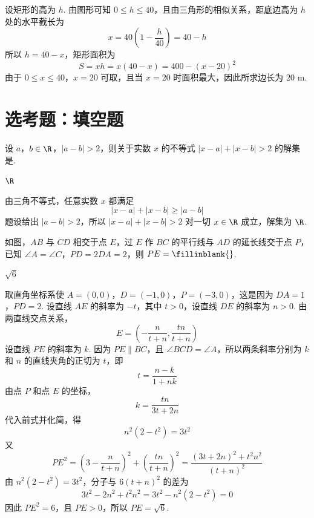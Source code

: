 \begin{solution}
设矩形的高为 \(h\). 由图形可知 \(0\leqslant h\leqslant40\)，且由三角形的相似关系，距底边高为 \(h\) 处的水平截长为
\[
x=40\left(1-\frac h{40}\right)=40-h
\]
所以 \(h=40-x\)，矩形面积为
\[
S=xh=x(40-x)=400-(x-20)^2
\]
由于 \(0\leqslant x\leqslant40\)，\(x=20\) 可取，且当 \(x=20\) 时面积最大，因此所求边长为 \(20\) \(\mathrm{m}\).
\end{solution}

\section{选考题：填空题}

\begin{problem}
设 \(a\)，\(b \in \R\)，\(|a - b| > 2\)，则关于实数 \(x\) 的不等式 \(|x - a| + |x - b| > 2\) 的解集是\fillinblank{}.
\end{problem}

\begin{answer}
\(\R\)
\end{answer}

\begin{solution}
由三角不等式，任意实数 \(x\) 都满足
\[
|x-a|+|x-b|\geqslant|a-b|
\]
题设给出 \(|a-b|>2\)，所以 \(|x-a|+|x-b|>2\) 对一切 \(x\in\R\) 成立，解集为 \(\R\).
\end{solution}

\begin{problem}
如图，\(AB\) 与 \(CD\) 相交于点 \(E\)，过 \(E\) 作 \(BC\) 的平行线与 \(AD\) 的延长线交于点 \(P\)，已知 \(\angle A = \angle C\)，\(PD = 2DA = 2\)，则 \(PE =\fillinblank{}\).
\end{problem}

\begin{answer}
\(\sqrt{6}\)
\end{answer}

\begin{solution}
取直角坐标系使 \(A=(0,0)\)，\(D=(-1,0)\)，\(P=(-3,0)\)，这是因为 \(DA=1\)，\(PD=2\). 设直线 \(AE\) 的斜率为 \(-t\)，其中 \(t>0\)，设直线 \(DE\) 的斜率为 \(n>0\). 由两直线交点关系，
\[
E=\left(-\frac{n}{t+n},\frac{tn}{t+n}\right)
\]
设直线 \(PE\) 的斜率为 \(k\). 因为 \(PE\parallel BC\)，且 \(\angle BCD=\angle A\)，所以两条斜率分别为 \(k\) 和 \(n\) 的直线夹角的正切为 \(t\)，即
\[
t=\frac{n-k}{1+nk}
\]
由点 \(P\) 和点 \(E\) 的坐标，
\[
k=\frac{tn}{3t+2n}
\]
代入前式并化简，得
\[
n^2(2-t^2)=3t^2
\]
又
\[
PE^2=\left(3-\frac{n}{t+n}\right)^2+\left(\frac{tn}{t+n}\right)^2
=\frac{(3t+2n)^2+t^2n^2}{(t+n)^2}
\]
由 \(n^2(2-t^2)=3t^2\)，分子与 \(6(t+n)^2\) 的差为
\[
3t^2-2n^2+t^2n^2=3t^2-n^2(2-t^2)=0
\]
因此 \(PE^2=6\)，且 \(PE>0\)，所以 \(PE=\sqrt6\).
\end{solution}


